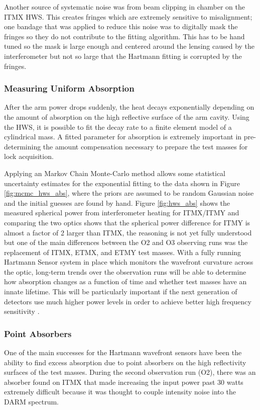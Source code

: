 	Another source of systematic noise was from beam clipping in chamber on the ITMX HWS. This creates fringes which are extremely sensitive to misalignment; one bandage that was applied to reduce this noise was to digitally mask the fringes so they do not contribute to the fitting algorithm.  This has to be hand tuned so the mask is large enough and centered around the lensing caused by the interferometer but not so large that the Hartmann fitting is corrupted by the fringes. 
	
	\subsubsection{Measuring Uniform Absorption}
	After the arm power drops suddenly, the heat decays exponentially depending on the amount of absorption on the high reflective surface of the arm cavity.  Using the HWS, it is possible to fit the decay rate to a finite element model of a cylindrical mass.  A fitted parameter for absorption is extremely important in pre-determining the amount compensation necessary to prepare the test masses for lock acquisition.  
	
	Applying an Markov Chain Monte-Carlo method allows some statistical uncertainty estimates for the exponential fitting to the data shown in Figure \ref{fig:mcmc_hws_abs}, where the priors are assumed to be random Gaussian noise and the initial guesses are found by hand. Figure \ref{fig:hws_abs} shows the measured spherical power from interferometer heating for ITMX/ITMY and comparing the two optics shows that the spherical power difference for ITMY is almost a factor of 2 larger than ITMX, the reasoning is not yet fully understood but one of the main differences between the O2 and O3 observing runs was the replacement of ITMX, ETMX, and ETMY test masses.  With a fully running Hartmann Sensor system in place which monitors the wavefront curvature across the optic, long-term trends over the observation runs will be able to determine how absorption changes as a function of time and whether test masses have an innate lifetime.  This will be particularly important if the next generation of detectors use much higher power levels in order to achieve better high frequency sensitivity \cite{DanBrown_prvt}.  
	
	\subsubsection{Point Absorbers}
	One of the main successes for the Hartmann wavefront sensors have been the ability to find excess absorption due to point absorbers on the high reflectivity surfaces of the test masses.  During the second observation run (O2), there was an absorber found on ITMX that made increasing the input power past 30 watts extremely difficult because it was thought to couple intensity noise into the DARM spectrum. 
	
